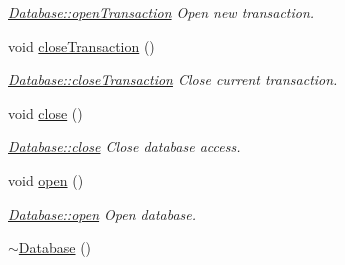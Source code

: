 \begin{DoxyCompactItemize}
\begin{DoxyCompactList}\small\item\em \hyperlink{classDatabases_1_1Database_a64d55cd9452bbf2a6fd1693df004de59}{Database\-::open\-Transaction} Open new transaction. \end{DoxyCompactList}\item 
\hypertarget{classDatabases_1_1Database_a56faa5446bd58e6b3c3a4c503d9309b1}{void \hyperlink{classDatabases_1_1Database_a56faa5446bd58e6b3c3a4c503d9309b1}{close\-Transaction} ()}\label{classDatabases_1_1Database_a56faa5446bd58e6b3c3a4c503d9309b1}

\begin{DoxyCompactList}\small\item\em \hyperlink{classDatabases_1_1Database_a56faa5446bd58e6b3c3a4c503d9309b1}{Database\-::close\-Transaction} Close current transaction. \end{DoxyCompactList}\item 
\hypertarget{classDatabases_1_1Database_a56127c397e3c424401d59d64cdb8e8fc}{void \hyperlink{classDatabases_1_1Database_a56127c397e3c424401d59d64cdb8e8fc}{close} ()}\label{classDatabases_1_1Database_a56127c397e3c424401d59d64cdb8e8fc}

\begin{DoxyCompactList}\small\item\em \hyperlink{classDatabases_1_1Database_a56127c397e3c424401d59d64cdb8e8fc}{Database\-::close} Close database access. \end{DoxyCompactList}\item 
\hypertarget{classDatabases_1_1Database_a53c4c277c2fbd3532d2bcaa1d47aed40}{void \hyperlink{classDatabases_1_1Database_a53c4c277c2fbd3532d2bcaa1d47aed40}{open} ()}\label{classDatabases_1_1Database_a53c4c277c2fbd3532d2bcaa1d47aed40}

\begin{DoxyCompactList}\small\item\em \hyperlink{classDatabases_1_1Database_a53c4c277c2fbd3532d2bcaa1d47aed40}{Database\-::open} Open database. \end{DoxyCompactList}\item 
\hypertarget{classDatabases_1_1Database_a457a2dac579f1ffc743f452a2dcbbd5c}{\hyperlink{classDatabases_1_1Database_a457a2dac579f1ffc743f452a2dcbbd5c}{$\sim$\-Database} ()}\label{classDatabases_1_1Database_a457a2dac579f1ffc743f452a2dcbbd5c}


\end{DoxyCompactItemize}
